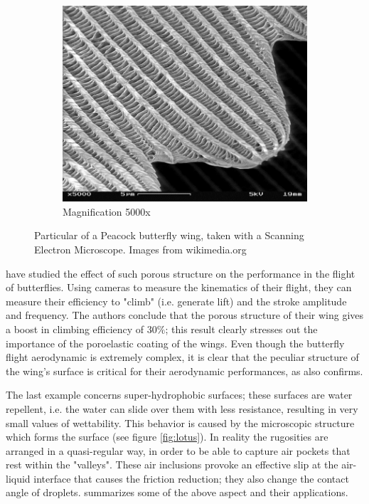 \begin{figure}[h]
\begin{subfigure}[b]{0.3\textwidth}
	\end{subfigure}
	\begin{subfigure}[b]{0.3\textwidth}
		\includegraphics[width=\textwidth]{chapter_1/butterfly3}
		\caption{Magnification 5000x}
		\label{fig:b5000}
	\end{subfigure}
	\caption{Particular of a Peacock butterfly wing, taken with a Scanning Electron Microscope.  Images from wikimedia.org}
	\label{fig:butterfly}
\end{figure}

\citet{slegers2017beneficial} have studied the effect of such porous structure on the performance in the flight of butterflies.
Using cameras to measure the kinematics of their flight, they can measure their efficiency to "climb" (i.e. generate lift) and the stroke amplitude and frequency.
The authors conclude that the porous structure of their wing gives a boost in climbing efficiency of $30\%$; this result clearly stresses out the importance of the poroelastic coating of the wings. 
Even though the butterfly flight aerodynamic is extremely complex, it is clear that the peculiar structure of the wing's surface is critical for their aerodynamic performances, as also \citet{srygley2002unconventional} confirms.

The last example concerns super-hydrophobic surfaces; these surfaces are water repellent, i.e. the water can slide over them with less resistance, resulting in very small values of wettability.
This behavior is caused by the microscopic structure which forms the surface (see figure \ref{fig:lotus}). In reality the rugosities are arranged in a quasi-regular way, in order to be able to capture air pockets that rest within the "valleys". These air inclusions provoke an effective slip at the air-liquid interface that causes the friction reduction; they also change the contact angle of droplets. \citet{bottaro2003effect} summarizes some of the above aspect and their applications.

